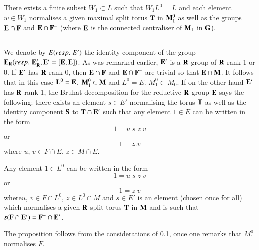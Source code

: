 \setcounter{definition}{14}
\begin{proposition}\label{art9-prop3.15}
There exists a finite subset $W_1 \subset L$ such that $W_1 L^0 = L$ and each element $w \in W_1$ normalises a given maximal split torus $\mathbf{T}$ in $\mathbf{M}^0_1$ as well as the groups $\mathbf{E} \cap \mathbf{F}$ and $\mathbf{E} \cap \mathbf{F}^-$ (where $\mathbf{E}$ is the connected centraliser of $\mathbf{M}_1$ in $\mathbf{G}$).
\end{proposition}

\setcounter{subsection}{15}
\subsection{}\label{art9-subsec3.16}
We denote by $E ({resp.}\kern.3em E')$ the identity component of the group $\mathbf{E}_{\mathbf{R}} ({resp.}\kern.3em \mathbf{E}'_{\mathbf{R}}, \mathbf{E}' =[\mathbf{E}, \mathbf{E}])$. As was remarked earlier, $\mathbf{E}'$ is a $\mathbf{R}$-group of $\mathbf{R}$-rank 1 or 0. If $\mathbf{E}'$ has $\mathbf{R}$-rank 0, then $\mathbf{E} \cap \mathbf{F}$ and $\mathbf{E} \cap \mathbf{F}^-$ are trivial so that $\mathbf{E} \cap \mathbf{M}$. It follows that in this case $\mathbf{L}^0 = \mathbf{E}$. $\mathbf{M}^0_1 \subset \mathbf{M}$ and $L^0 = E$. $M^0_1 \subset M_0$. If on the other hand $\mathbf{E}'$ has $\mathbf{R}$-rank 1, the Bruhat-decomposition for the reductive $\mathbf{R}$-group $\mathbf{E}$ says the following: there exists an element $s \in E'$ normalising the torus $\mathbf{T}$ as well as the identity component $\mathbf{S}$ to $\mathbf{T} \cap \mathbf{E}'$ such that any element $1 \in E$ can be written in the form
$$
1 = u \;s \;z \;v
$$
or 
$$
1 = z . v
$$
where $u$, $v \in F \cap E$, $z \in M \cap E$.

\setcounter{definition}{16}
\begin{proposition}\label{art9-prop3.17}
Any element $1 \in L^0$ can be written in the form 
$$
1 = u \;s \;z \;v
$$
or 
$$
1 = z\; v
$$
where\pageoriginale $u$, $v \in F \cap L^0$, $z \in L^0 \cap M$ and $s \in E'$ is an element (chosen once for all) which normalises a given $\mathbf{R}$-split torus $\mathbf{T}$ in $\mathbf{M}$ and is such that $s (\mathbf{F} \cap \mathbf{E}') = \mathbf{F}^- \cap \mathbf{E}'$.
\end{proposition}

The proposition follows from the considerations of \ref{art9-subsec3.16}, once one remarks that $M^0_1$ normalises $F$.

\setcounter{subsection}{17}
